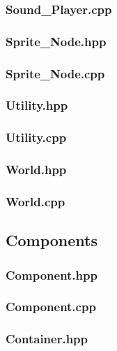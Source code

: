 \subsubsection{Sound\_Player.cpp}

\subsubsection{Sprite\_Node.hpp}

\subsubsection{Sprite\_Node.cpp}

\subsubsection{Utility.hpp}

\subsubsection{Utility.cpp}

\subsubsection{World.hpp}

\subsubsection{World.cpp}


\subsection{Components}
\subsubsection{Component.hpp}

\subsubsection{Component.cpp}

\subsubsection{Container.hpp}

